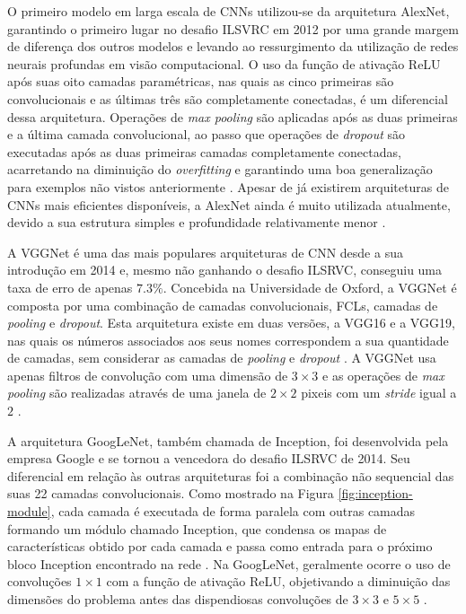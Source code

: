 O primeiro modelo em larga escala de CNNs utilizou-se da arquitetura AlexNet, garantindo o primeiro lugar no desafio ILSVRC em 2012 por uma grande margem de diferença dos outros modelos e levando ao ressurgimento da utilização de redes neurais profundas em visão computacional. O uso da função de ativação ReLU após suas oito camadas paramétricas, nas quais as cinco primeiras são convolucionais e as últimas três são completamente conectadas, é um diferencial dessa arquitetura. Operações de \emph{max pooling} são aplicadas após as duas primeiras e a última camada convolucional, ao passo que operações de \emph{dropout} são executadas após as duas primeiras camadas completamente conectadas, acarretando na diminuição do \emph{overfitting} e garantindo uma boa generalização para exemplos não vistos anteriormente \cite{khan}. Apesar de já existirem arquiteturas de CNNs mais eficientes disponíveis, a AlexNet ainda é muito utilizada atualmente, devido a sua estrutura simples e profundidade relativamente menor \cite{sewak}.

A VGGNet é uma das mais populares arquiteturas de CNN desde a sua introdução em 2014 e, mesmo não ganhando o desafio ILSRVC, conseguiu uma taxa de erro de apenas $7.3 \%$. Concebida na Universidade de Oxford, a VGGNet é composta por uma combinação de camadas convolucionais, FCLs, camadas de \emph{pooling} e \emph{dropout}. Esta arquitetura existe em duas versões, a VGG16 e a VGG19, nas quais os números associados aos seus nomes correspondem a sua quantidade de camadas, sem considerar as camadas de \emph{pooling} e \emph{dropout} \cite{khan, sewak}. A VGGNet usa apenas filtros de convolução com uma dimensão de  $3 \times 3$ e as operações de \emph{max pooling} são realizadas através de uma janela de $2 \times 2$ pixeis com um \emph{stride} igual a $2$ \cite{simonyan}.

A arquitetura GoogLeNet, também chamada de Inception, foi desenvolvida pela empresa Google e se tornou a vencedora do desafio ILSRVC de 2014. Seu diferencial em relação às outras arquiteturas foi a combinação não sequencial das suas 22 camadas convolucionais. Como mostrado na Figura \ref{fig:inception-module}, cada camada é executada de forma paralela com outras camadas formando um módulo chamado Inception, que condensa os mapas de características obtido por cada camada e passa como entrada para o próximo bloco Inception encontrado na rede \cite{khan}. Na GoogLeNet, geralmente ocorre o uso de convoluções $1 \times 1$ com a função de ativação ReLU, objetivando a diminuição das dimensões do problema antes das dispendiosas convoluções de $3 \times 3$ e $5 \times 5$ \cite{sewak}.

